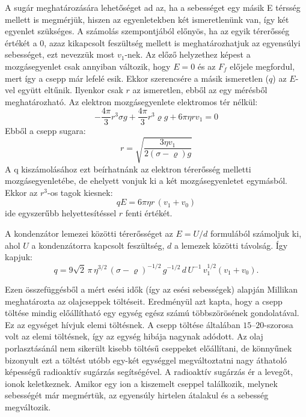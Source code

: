\documentclass[a4paper,12pt]{article}
\begin{document}
A sugár meghatározására lehetőséget ad az, ha a sebességet egy másik
E térsség mellett is megmérjük, hiszen az egyenletekben két ismeretlenünk
van, így két egyenlet szükséges.
A számolás szempontjából előnyös, ha az egyik térerősség értékét a 0,
azaz kikapcsolt feszültség mellett is meghatározhatjuk az egyensúlyi
sebességet, ezt nevezzük most $v_1$-nek.
Az előző helyzethez képest a mozgásegyenlet csak annyiban változik,
hogy $E = 0$ és az $F_f$ előjele megfordul, mert így a csepp már lefelé esik.
Ekkor szerencsére a másik ismeretlen ($q$) az $E$-vel együtt eltűnik.
Ilyenkor csak $r$ az ismeretlen, ebből az egy mérésből meghatározható.
Az elektron mozgásegyenlete elektromos tér nélkül:
\begin{equation}
-\frac{4\pi}{3}r^3\sigma g + \frac{4\pi}{3}r^3\varrho g + 6\pi\eta r v_1 = 0
\end{equation}
Ebből a csepp sugara:
\begin{equation}
r = \sqrt{\frac{3\eta v_1}{2(\sigma-\varrho)g}}
\end{equation}
A q kiszámolásához ezt beírhatnánk az elektron térerősség melletti
mozgásegyenletébe, de ehelyett vonjuk ki a két mozgásegyenletet
egymásból.
Ekkor az $r^3$-os tagok kiesnek:
\begin{equation}
qE = 6\pi\eta r\,(v_1+v_0)
\end{equation}
ide egyszerűbb helyettesítéssel $r$ fenti értékét.

A kondenzátor lemezei közötti térerősséget az $E=U/d$ formulából
számoljuk ki, ahol $U$ a kondenzátorra kapcsolt feszültség, $d$ a lemezek
közötti távolság.
Így kapjuk:
\begin{equation}
q = 9\sqrt{2}\,\pi\,\eta^{3/2}\,(\sigma-\varrho)^{-1/2}\,g^{-1/2}\,
d\,U^{-1}\,v_1^{1/2}(v_1+v_0).
\end{equation}

Ezen összefüggésből a mért esési idők (így az esési sebességek)
alapján Millikan meghatározta az olajcseppek töltéseit.
Eredményül azt kapta, hogy a csepp töltése mindig előállítható egy
egység egész számú többszörösének gondolatával.
Ez az egységet hívjuk elemi töltésnek.
A csepp töltése általában $15$--$20$-szorosa volt az elemi töltésnek,
így az egység hibája nagynak adódott.
Az olaj porlasztásánál nem sikerült kisebb töltésű cseppeket előállítani,
de könnyűnek bizonyult ezt a töltést utóbb egy-két egységgel
megváltoztatni nagy áthatoló képességű radioaktív sugárzás segítségével.
A radioaktív sugárzás ér a levegőt, ionok keletkeznek.
Amikor egy ion a kiszemelt cseppel találkozik, melynek sebességét már
megmértük, az egyensúly hirtelen átalakul és a sebesség megváltozik.
\end{document}
